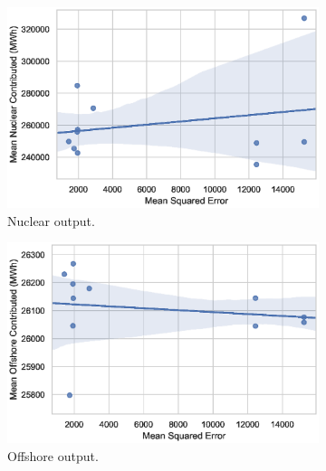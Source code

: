 \begin{figure}[h!]
\begin{subfigure}[b]{0.3\textwidth}
\includegraphics[width=\columnwidth]{Chapter5/figures/market-forecasting/results/elecsim_results/results_2/contributed_Nuclear_mean_output.eps}
\caption{Nuclear output.}
\label{fig:contributed_Nuclear_mean_output}
\end{subfigure}
\medskip
\begin{subfigure}[b]{0.3\textwidth}   
\includegraphics[width=\columnwidth]{Chapter5/figures/market-forecasting/results/elecsim_results/results_2/contributed_Offshore_mean_output.eps}
\caption{Offshore output.}
\label{fig:contributed_Offshore_mean_output.eps}
\end{subfigure}
\hfil
\begin{subfigure}[b]{0.3\textwidth}   

\end{subfigure}
\end{figure}
